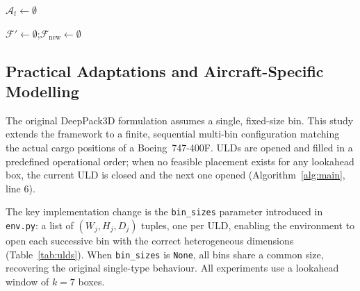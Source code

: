 \documentclass[12pt,a4paper]{article}
\begin{document}
\begin{algorithm}[htbp]
\SetAlgoLined\DontPrintSemicolon
{}
$\mathcal{A}_t\leftarrow\emptyset$\;
\caption{\textsc{FeasiblePlacements}}
\label{alg:feasible}
\end{algorithm}

\begin{algorithm}[htbp]
\SetAlgoLined\DontPrintSemicolon
{}
$\mathcal{F}'\leftarrow\emptyset$;\quad $\mathcal{F}_\mathrm{new}\leftarrow\emptyset$\;
\caption{\textsc{SpacePartition}: maximal-cuboid decomposition}
\label{alg:partition}
\end{algorithm}

\subsection{Practical Adaptations and Aircraft-Specific Modelling}
\label{sec:adaptations}

The original DeepPack3D formulation assumes a single, fixed-size bin.
This study extends the framework to a finite, sequential multi-bin
configuration matching the actual cargo positions of a Boeing~747-400F.
ULDs are opened and filled in a predefined operational order; when no
feasible placement exists for any lookahead box, the current ULD is
closed and the next one opened (Algorithm~\ref{alg:main}, line 6).

The key implementation change is the \texttt{bin\_sizes} parameter
introduced in \texttt{env.py}: a list of $(W_j, H_j, D_j)$ tuples,
one per ULD, enabling the environment to open each successive bin with
the correct heterogeneous dimensions (Table~\ref{tab:ulds}).
When \texttt{bin\_sizes} is \texttt{None}, all bins share a common
size, recovering the original single-type behaviour.
All experiments use a lookahead window of $k=7$ boxes.
\end{document}
